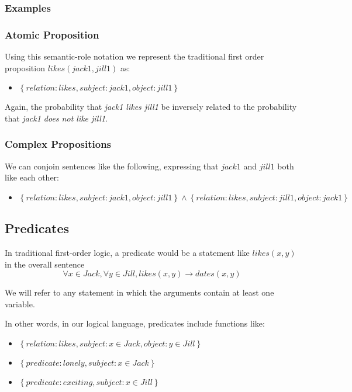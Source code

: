\documentclass[12pt]{article}
\begin{document}
\subsubsection{Examples}
\subsubsection{Atomic Proposition}
Using this semantic-role notation we represent the traditional first order proposition $likes(jack1, jill1)$ as:
\begin{itemize}
    \item $\left\{relation:likes, subject:jack1, object:jill1 \right\}$
\end{itemize}
Again, the probability that {\em jack1 likes jill1} be inversely related to the probability that {\em jack1 does not like jill1}.

\subsubsection{Complex Propositions}
We can conjoin sentences like the following, expressing that $jack1$ and $jill1$ both like each other:
\begin{itemize}
    \item $\left\{relation:likes, subject:jack1, object:jill1 \right\} \wedge \left\{relation:likes, subject:jill1, object:jack1 \right\}$
\end{itemize}

\subsection{Predicates}
In traditional first-order logic, a predicate would be a statement like $likes(x, y)$ in the overall sentence
\[ \forall x\in Jack, \forall y \in Jill, likes(x,y) \rightarrow dates(x, y) \]

We will refer to any statement in which the arguments contain at least one variable.

In other words, in our logical language, predicates include functions like:
\begin{itemize}
\item $\left\{relation:likes, subject:{x \in Jack}, object:{y \in Jill} \right\}$
\item $\left\{predicate:lonely, subject:{x \in Jack} \right\}$
\item $\left\{predicate:exciting, subject:{x \in Jill} \right\}$
\end{itemize}
\end{document}
